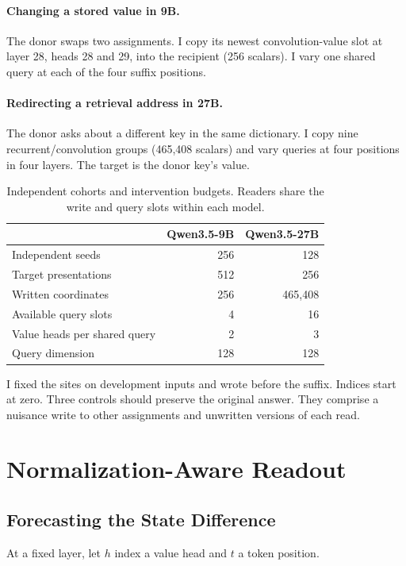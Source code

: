 \documentclass[letterpaper]{article}
\begin{document}
\paragraph{Changing a stored value in 9B.}
The donor swaps two assignments. I copy its newest convolution-value slot at layer 28, heads 28 and 29, into the recipient (256 scalars). I vary one shared query at each of the four suffix positions.

\paragraph{Redirecting a retrieval address in 27B.}
The donor asks about a different key in the same dictionary. I copy nine recurrent/convolution groups (465,408 scalars) and vary queries at four positions in four layers. The target is the donor key's value.

\begin{table}[t]
\centering
\small
\begin{tabular}{lrr}
\toprule
 & Qwen3.5-9B & Qwen3.5-27B\\
\midrule
Independent seeds & 256 & 128\\
Target presentations & 512 & 256\\
Written coordinates & 256 & 465,408\\
Available query slots & 4 & 16\\
Value heads per shared query & 2 & 3\\
Query dimension & 128 & 128\\
\bottomrule
\end{tabular}
\caption{Independent cohorts and intervention budgets. Readers share the write and query slots within each model.}
\label{tab:design}
\end{table}

I fixed the sites on development inputs and wrote before the suffix. Indices start at zero. Three controls should preserve the original answer. They comprise a nuisance write to other assignments and unwritten versions of each read.

\section{Normalization-Aware Readout}
\subsection{Forecasting the State Difference}
At a fixed layer, let $h$ index a value head and $t$ a token position.
\end{document}
